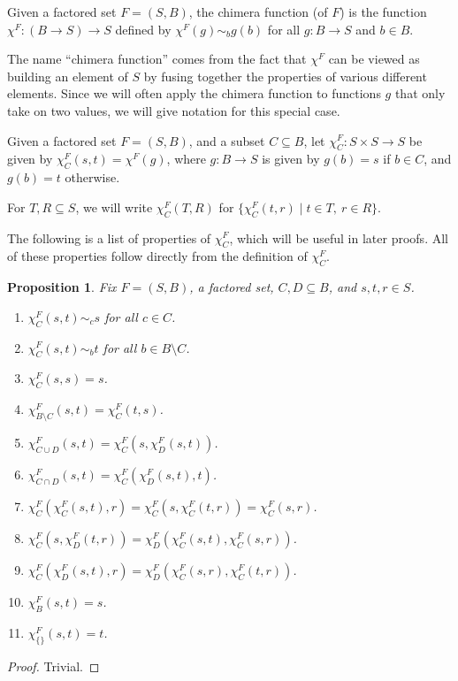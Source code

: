 \documentclass[authordate,onecolumn]{miri-tech-article}
\newtheorem{proposition}{Proposition}
\begin{document}
\begin{definition}
Given a factored set $F=(S,B)$, the chimera function (of $F$) is the function $\chi^F:(B\rightarrow S)\rightarrow S$ defined by $\chi^F(g)\sim_b g(b)$ for all $g:B\rightarrow S$ and $b\in B$.
\end{definition}
The name ``chimera function'' comes from the fact that $\chi^F$ can be viewed as building an element of $S$ by fusing together the properties of various different elements. Since we will often apply the chimera function to functions $g$ that only take on two values, we will give notation for this special case.
\begin{definition}
Given a factored set $F=(S,B)$, and a subset $C\subseteq B$, let $\chi^F_C:S\times S\rightarrow S$ be given by $\chi^F_C(s,t)=\chi^F(g)$, where $g:B\rightarrow S$ is given by $g(b)=s$ if $b\in C$, and $g(b)=t$ otherwise.

For $T,R\subseteq S$, we will write $\chi^F_C(T,R)$ for $\{\chi^F_C(t,r)\mid t\in T,\ r\in R\}$.
\end{definition}
The following is a list of properties of $\chi^F_C$, which will be useful in later proofs. All of these properties follow directly from the definition of $\chi^F_C$.
\begin{proposition}
Fix $F=(S,B)$, a factored set, $C,D\subseteq B$, and $s,t,r\in S$.

\begin{enumerate}
    \item $\chi^F_C(s,t)\sim_c s$ for all $c\in C$.
    \item $\chi^F_C(s,t)\sim_b t$ for all $b\in B\setminus C$.
    \item $\chi^F_{C}(s,s)=s$.
    \item $\chi^F_{B\setminus C}(s,t)=\chi^F_{C}(t,s)$.
    \item $\chi^F_{C\cup D}(s,t)=\chi^F_{C}(s,\chi^F_{D}(s,t))$.
    \item $\chi^F_{C\cap D}(s,t)=\chi^F_{C}(\chi^F_{D}(s,t),t)$.
    \item $\chi^F_{C}(\chi^F_{C}(s,t),r)=\chi^F_{C}(s,\chi^F_{C}(t,r))=\chi^F_{C}(s,r)$.
    \item $\chi^F_{C}(s,\chi^F_{D}(t,r))=\chi^F_{D}(\chi^F_{C}(s,t),\chi^F_{C}(s,r))$.
    \item $\chi^F_{C}(\chi^F_{D}(s,t),r)=\chi^F_{D}(\chi^F_{C}(s,r),\chi^F_{C}(t,r))$.
    \item $\chi^F_B(s,t)=s$.
    \item $\chi^F_{\{\}}(s,t)=t$.
    
\end{enumerate}
\end{proposition}
\begin{proof}
Trivial.
\end{proof}
\end{document}
